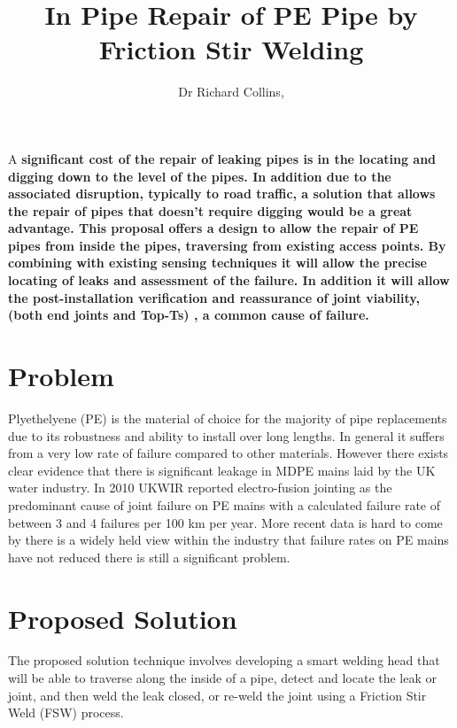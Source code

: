\documentclass[	DIV=calc,%
							paper=a4,%
							fontsize=11pt,%
							twocolumn]{scrartcl}	 					%
\title{In Pipe Repair of PE Pipe by Friction Stir Welding}
\author{Dr Richard Collins, }											%
\date{}																				%
\newcommand{\initial}[1]{%
     \lettrine[lines=3,lhang=0.3,nindent=0em]{
     				\color{Black}
     				{\textsf{#1}}}{}}
\begin{document}
\maketitle
\thispagestyle{fancy} 			%

\initial{A} \textbf{significant cost of the repair of leaking pipes is in the locating and digging down to the level of the pipes.  
In addition due to the associated disruption, typically to road traffic, a solution that allows the repair of pipes that doesn't require digging would be a great advantage.  This proposal offers a design to allow the repair of PE pipes from inside the pipes, traversing from existing access points. By combining with existing sensing techniques it will allow the precise locating of leaks and assessment of the failure. In addition it will allow the post-installation verification and reassurance of joint viability, (both end joints and Top-Ts) , a common cause of failure.}





\section*{Problem}
Plyethelyene (PE) is the material of choice for the majority of pipe replacements due to its robustness and ability to install over long lengths. 
In general it suffers from a very low rate of failure compared to other materials. 
However there exists clear evidence that there is significant leakage in MDPE mains laid by the UK water industry.
In 2010 UKWIR \cite{UKWIR2010} reported electro-fusion jointing as the predominant cause of joint failure on PE mains with a calculated failure rate of between 3 and 4 failures per 100 km per year. 
More recent data is hard to come by there is a widely held view within the industry that failure rates on PE mains have not reduced there is still a significant problem.



\section*{Proposed Solution}
The proposed solution technique involves developing a smart welding head that will be able to traverse along the inside of a pipe, detect and locate the leak or joint, and then weld the leak closed, or re-weld the joint using a Friction Stir Weld (FSW) process.
\end{document}
